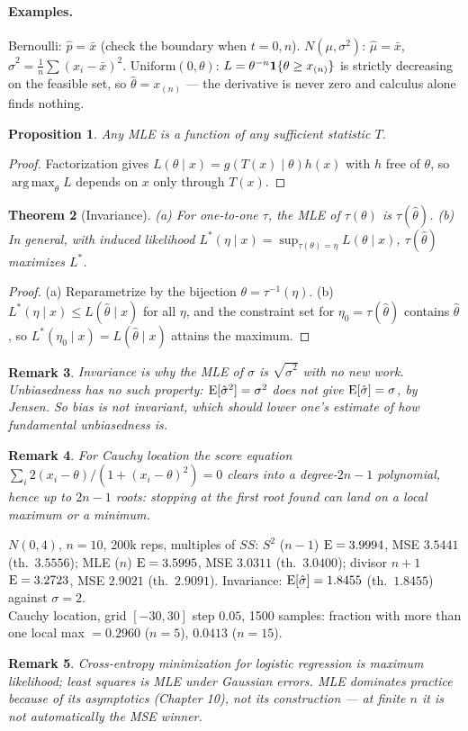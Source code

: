 \documentclass[11pt]{article}
\newtheorem{theorem}{Theorem}[section]
\newtheorem{remark}[theorem]{Remark}
\newtheorem{proposition}[theorem]{Proposition}
\DeclareMathOperator*{\argmax}{arg\,max}
\begin{document}
\paragraph{Examples.} Bernoulli: $\hat p=\bar x$ (check the boundary when $t=0,n$). $N(\mu,\sigma^2)$: $\hat\mu=\bar x$, $\hat\sigma^2=\frac1n\sum(x_i-\bar x)^2$. $\mathrm{Uniform}(0,\theta)$: $L=\theta^{-n}\mathbf 1\{\theta\ge x_{(n)}\}$ is strictly decreasing on the feasible set, so $\hat\theta=x_{(n)}$ --- the derivative is never zero and calculus alone finds nothing.
\begin{proposition}
Any MLE is a function of any sufficient statistic $T$.
\end{proposition}
\begin{proof}
Factorization gives $L(\theta\mid x)=g(T(x)\mid\theta)h(x)$ with $h$ free of $\theta$, so $\argmax_\theta L$ depends on $x$ only through $T(x)$.
\end{proof}
\begin{theorem}[Invariance]
(a) For one-to-one $\tau$, the MLE of $\tau(\theta)$ is $\tau(\hat\theta)$. (b) In general, with induced likelihood $L^*(\eta\mid x)=\sup_{\tau(\theta)=\eta}L(\theta\mid x)$, $\tau(\hat\theta)$ maximizes $L^*$.
\end{theorem}
\begin{proof}
(a) Reparametrize by the bijection $\theta=\tau^{-1}(\eta)$. (b) $L^*(\eta\mid x)\le L(\hat\theta\mid x)$ for all $\eta$, and the constraint set for $\eta_0=\tau(\hat\theta)$ contains $\hat\theta$, so $L^*(\eta_0\mid x)=L(\hat\theta\mid x)$ attains the maximum.
\end{proof}
\begin{remark}
Invariance is why the MLE of $\sigma$ is $\sqrt{\hat\sigma^2}$ with no new work. Unbiasedness has no such property: $\operatorname{E}[\hat\sigma^2]=\sigma^2$ does not give $\operatorname{E}[\hat\sigma]=\sigma$, by Jensen. So bias is not invariant, which should lower one's estimate of how fundamental unbiasedness is.
\end{remark}
\begin{remark}
For Cauchy location the score equation $\sum_i2(x_i-\theta)/(1+(x_i-\theta)^2)=0$ clears into a degree-$2n-1$ polynomial, hence up to $2n-1$ roots: stopping at the first root found can land on a local maximum or a minimum.
\end{remark}
\begin{simbox}
$N(0,4)$, $n=10$, 200k reps, multiples of $SS$: $S^2$ ($n-1$) $\operatorname{E}=3.9994$, MSE $3.5441$ (th.\ $3.5556$); MLE ($n$) $\operatorname{E}=3.5995$, MSE $3.0311$ (th.\ $3.0400$); divisor $n+1$ $\operatorname{E}=3.2723$, MSE $2.9021$ (th.\ $2.9091$). Invariance: $\operatorname{E}[\hat\sigma]=1.8455$ (th.\ $1.8455$) against $\sigma=2$.\\
Cauchy location, grid $[-30,30]$ step $0.05$, 1500 samples: fraction with more than one local max $=0.2960$ ($n=5$), $0.0413$ ($n=15$).
\end{simbox}
\begin{remark}
Cross-entropy minimization for logistic regression \emph{is} maximum likelihood; least squares is MLE under Gaussian errors. MLE dominates practice because of its asymptotics (Chapter 10), not its construction --- at finite $n$ it is not automatically the MSE winner.
\end{remark}
\end{document}
